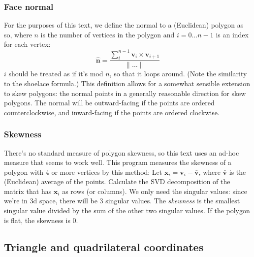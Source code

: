 \documentclass{amsart}[12pt]
\begin{document}
\subsubsection{Face normal}
For the purposes of this text, we define the normal to a (Euclidean) polygon as
so, where $n$ is the number of vertices in the polygon and
$i = 0 \dots n-1$ is an index for each vertex:
\begin{equation}
  \hat{\mathbf{n}} =
  \frac{\sum^{n-1}_i \mathbf{v}_i \times \mathbf{v}_{i+1}}{\|\dots\|}
\end{equation}
$i$ should be treated as if it's mod $n$, so that it loops around.
(Note the similarity to the shoelace formula.)
This definition allows for a somewhat sensible extension to skew polygons:
the normal points in a generally reasonable direction for skew polygons.
The normal will be outward-facing if the points are ordered counterclockwise,
and inward-facing if the points are ordered clockwise.

\subsubsection{Skewness}
There's no standard measure of polygon skewness, so this text uses an ad-hoc
measure that seems to work well. This program measures the skewness of a polygon
with 4 or more vertices by this method: Let $\mathbf x_i = \mathbf{v}_i -
\bar{\mathbf{v}}$, where $\bar{\mathbf{v}}$ is the (Euclidean) average of the
points. Calculate the SVD decomposition of the matrix that has $\mathbf x_i$
as rows (or columns). We only need the singular values: since we're in 3d
space, there will be 3 singular values. The \textit{skewness} is the smallest
singular value divided by the sum of the  other two singular values.
If the polygon is flat, the skewness is 0.

\subsection{Triangle and quadrilateral coordinates}
\end{document}
